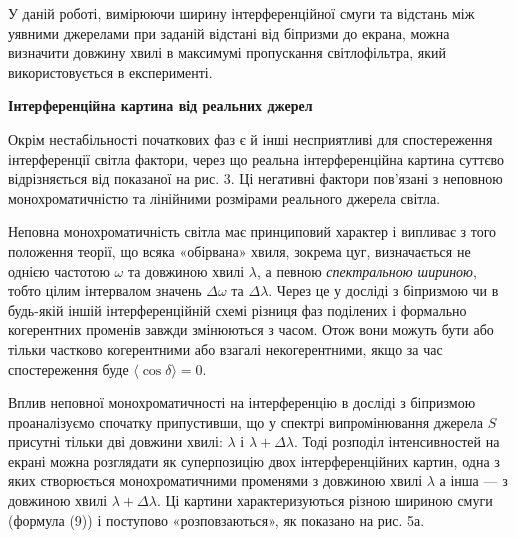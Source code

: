 \documentclass[12pt,a4paper]{article}
\begin{document}
    У даній роботі, вимірюючи ширину інтерференційної смуги та відстань
    між уявними джерелами при заданій відстані від біпризми до екрана, можна
    визначити довжину хвилі в максимумі пропускання світлофільтра, який використовується в експерименті.

    \begin{center} \textbf{Інтерференційна картина від реальних джерел} \end{center}

    Окрім нестабільності початкових фаз є й інші несприятливі для спостереження інтерференції світла фактори, через що реальна
    інтерференційна картина суттєво відрізняється від показаної на рис. 3.
    Ці негативні фактори пов'язані з неповною монохроматичністю та лінійними розмірами реального джерела світла.

    Неповна монохроматичність світла має принциповий характер і випливає з того
    положення теорії, що всяка «обірвана» хвиля, зокрема цуг, визначається не однією
    частотою $\omega$ та довжиною хвилі $\lambda$, а певною \textit{спектральною шириною},
    тобто цілим інтервалом значень $\Delta \omega$ та $\Delta \lambda$.
    Через це у досліді з біпризмою чи в будь-якій іншій інтерференційній схемі різниця
    фаз поділених і формально когерентних променів завжди змінюються з часом.
    Отож вони можуть бути або тільки частково когерентними або взагалі
    некогерентними, якщо за час спостереження буде $\langle \cos \delta \rangle = 0$.

    Вплив неповної монохроматичності на інтерференцію в досліді з біпризмою
    проаналізуємо спочатку припустивши, що у спектрі випромінювання
    джерела $S$ присутні тільки дві довжини хвилі: $\lambda$ і $\lambda + \Delta \lambda$.
    Тоді розподіл інтенсивностей на екрані можна розглядати як суперпозицію двох
    інтерференційних картин, одна з яких створюється монохроматичними променями
    з довжиною хвилі $\lambda$ а інша --- з довжиною хвилі $\lambda + \Delta \lambda$.
    Ці картини характеризуються різною шириною смуги (формула (9)) і
    поступово «розповзаються», як показано на рис. 5а.
\end{document}
